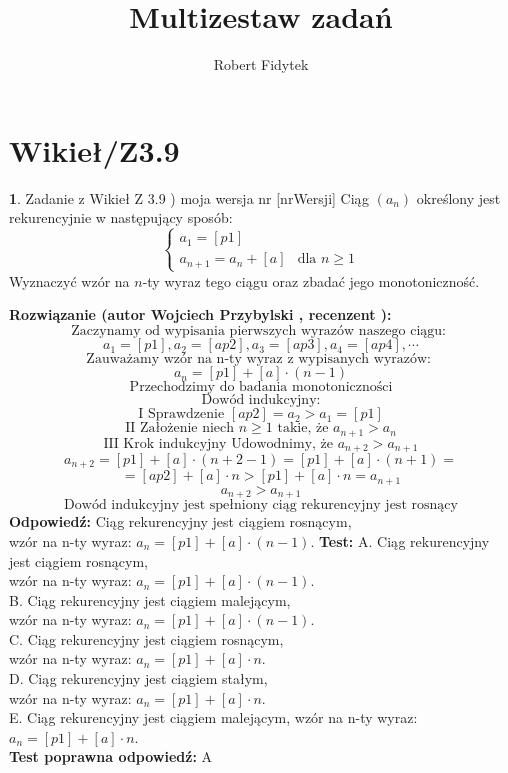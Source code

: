 \documentclass[12pt, a4paper]{article}
\title{Multizestaw zadań}
\author{Robert Fidytek}
\date{}
\theoremstyle{definition} %
\newtheorem{zad}{}
\newcommand{\kategoria}[1]{\section{#1}} %
\newcommand{\zadStart}[1]{\begin{zad}#1\newline} %
\newcommand{\zadStop}{\end{zad}}   %
\newcommand{\rozwStart}[2]{\noindent \textbf{Rozwiązanie (autor #1 , recenzent #2): }\newline} %
\newcommand{\rozwStop}{\newline}                                            %
\newcommand{\odpStart}{\noindent \textbf{Odpowiedź:}\newline}    %
\newcommand{\odpStop}{\newline}                                             %
\newcommand{\testStart}{\noindent \textbf{Test:}\newline} %
\newcommand{\testStop}{\newline} %
\newcommand{\kluczStart}{\noindent \textbf{Test poprawna odpowiedź:}\newline} %
\newcommand{\kluczStop}{\newline} %
\begin{document}
\maketitle


\kategoria{Wikieł/Z3.9}
\zadStart{Zadanie z Wikieł Z 3.9 ) moja wersja nr [nrWersji]}
Ciąg $(a_{n})$ określony jest rekurencyjnie w następujący sposób:
$$
 \left\{ \begin{array}{ll}
a_{1}= [p1] & \\
a_{n+1}=a_{n}+[a] & \mbox{dla }n\geq1
\end{array} \right.
$$
Wyznaczyć wzór na $n$-ty wyraz tego ciągu oraz zbadać jego monotoniczność. 
\zadStop
\rozwStart{Wojciech Przybylski}{}
$$\mbox{Zaczynamy od wypisania pierwszych wyrazów naszego ciągu: }$$
$$a_{1}=[p1], a_{2}=[ap2], a_{3}=[ap3], a_{4}=[ap4],\cdots $$
$$\mbox{Zauważamy wzór na n-ty wyraz z wypisanych wyrazów: }$$
$$a_{n}=[p1]+[a]\cdot(n-1)$$
$$\mbox{Przechodzimy do badania monotoniczności}$$
$$\mbox{Dowód indukcyjny:}$$
$$\mbox{I Sprawdzenie } [ap2]=a_{2}>a_{1}=[p1]$$
$$\mbox{II Założenie niech }n\geq1 \mbox{ takie, że } a_{n+1}>a_{n}$$
$$\mbox{III Krok indukcyjny }\mbox{Udowodnimy, że } a_{n+2}>a_{n+1}$$
$$a_{n+2}=[p1]+[a]\cdot(n+2-1)=[p1]+[a]\cdot(n+1)=$$
$$=[ap2]+[a]\cdot n>[p1]+[a]\cdot n=a_{n+1}$$
$$a_{n+2}>a_{n+1}$$
$$\mbox{Dowód indukcyjny jest spełniony ciąg rekurencyjny jest rosnący}$$
\rozwStop
\odpStart
Ciąg rekurencyjny jest ciągiem rosnącym, \\
wzór na n-ty wyraz: $a_{n}=[p1]+[a]\cdot(n-1)$.
\odpStop
\testStart
A. Ciąg rekurencyjny jest ciągiem rosnącym,\\
    wzór na n-ty wyraz: $a_{n}=[p1]+[a]\cdot(n-1)$.\\
B. Ciąg rekurencyjny jest ciągiem malejącym,\\
    wzór na n-ty wyraz: $a_{n}=[p1]+[a]\cdot(n-1)$.\\
C. Ciąg rekurencyjny jest ciągiem rosnącym,\\
    wzór na n-ty wyraz: $a_{n}=[p1]+[a]\cdot n$.\\
D. Ciąg rekurencyjny jest ciągiem stałym,\\
    wzór na n-ty wyraz: $a_{n}=[p1]+[a]\cdot n$.\\
E. Ciąg rekurencyjny jest ciągiem malejącym,
    wzór na n-ty wyraz: $a_{n}=[p1]+[a]\cdot n$.\\
\testStop
\kluczStart
A
\kluczStop
\end{document}
